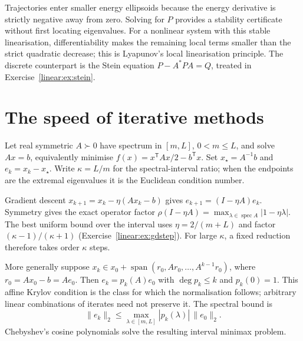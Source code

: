Trajectories enter smaller energy ellipsoids because the energy derivative is strictly negative away from zero. Solving for $P$ provides a stability certificate without first locating eigenvalues. For a nonlinear system with this stable linearisation, differentiability makes the remaining local terms smaller than the strict quadratic decrease; this is Lyapunov's local linearisation principle. The discrete counterpart is the Stein equation $P-A^*PA=Q$, treated in Exercise~\ref{linear:ex:stein}.

\section{The speed of iterative methods}

Let real symmetric $A\succ0$ have spectrum in $[m,L]$, $0<m\le L$, and solve $Ax=b$, equivalently minimise $f(x)=x^{\mathsf T}Ax/2-b^{\mathsf T}x$. Set $x_\star=A^{-1}b$ and $e_k=x_k-x_\star$. Write $\kappa=L/m$ for the spectral-interval ratio; when the endpoints are the extremal eigenvalues it is the Euclidean condition number.

Gradient descent $x_{k+1}=x_k-\eta(Ax_k-b)$ gives $e_{k+1}=(I-\eta A)e_k$. Symmetry gives the exact operator factor $\rho(I-\eta A)=\max_{\lambda\in\operatorname{spec}A}|1-\eta\lambda|$. The best uniform bound over the interval uses $\eta=2/(m+L)$ and factor $(\kappa-1)/(\kappa+1)$ (Exercise~\ref{linear:ex:gdstep}). For large $\kappa$, a fixed reduction therefore takes order $\kappa$ steps.

More generally suppose $x_k\in x_0+\operatorname{span}(r_0,Ar_0,\ldots,A^{k-1}r_0)$, where $r_0=Ax_0-b=Ae_0$. Then $e_k=p_k(A)e_0$ with $\deg p_k\le k$ and $p_k(0)=1$. This affine Krylov condition is the class for which the normalisation follows; arbitrary linear combinations of iterates need not preserve it. The spectral bound is
\[\|e_k\|_2\le\max_{\lambda\in[m,L]}|p_k(\lambda)|\,\|e_0\|_2.
\]
Chebyshev's cosine polynomials solve the resulting interval minimax problem.

